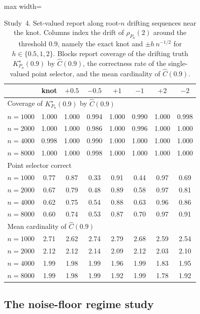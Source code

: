 \documentclass[11pt]{article}
\begin{document}
\begin{table}[t]
\centering
\caption{Study~4. Set-valued report along root-$n$ drifting sequences near the knot. Columns index the drift of $\rho_{P_n}(2)$ around the threshold $0.9$, namely the exact knot and $\pm h\,n^{-1/2}$ for $h\in\{0.5,1,2\}$. Blocks report coverage of the drifting truth $K^\star_{P_n}(0.9)$ by $\widehat C(0.9)$, the correctness rate of the single-valued point selector, and the mean cardinality of $\widehat C(0.9)$.}
\label{tab:sims:study5_addtional}
\begin{adjustbox}{max width=\textwidth}
\begin{tabular}{l ccccccc}
\toprule
& knot & $+0.5$ & $-0.5$ & $+1$ & $-1$ & $+2$ & $-2$\\
\midrule
\multicolumn{8}{l}{Coverage of $K^\star_{P_n}(0.9)$ by $\widehat C(0.9)$}\\
$n=1000$ & 1.000 & 1.000 & 0.994 & 1.000 & 0.990 & 1.000 & 0.998\\
$n=2000$ & 1.000 & 1.000 & 0.986 & 1.000 & 0.996 & 1.000 & 1.000\\
$n=4000$ & 0.998 & 1.000 & 0.990 & 1.000 & 1.000 & 1.000 & 1.000\\
$n=8000$ & 1.000 & 1.000 & 0.998 & 1.000 & 1.000 & 1.000 & 1.000\\
\midrule
\multicolumn{8}{l}{Point selector correct}\\
$n=1000$ & 0.77 & 0.87 & 0.33 & 0.91 & 0.44 & 0.97 & 0.69\\
$n=2000$ & 0.67 & 0.79 & 0.48 & 0.89 & 0.58 & 0.97 & 0.81\\
$n=4000$ & 0.62 & 0.75 & 0.54 & 0.88 & 0.63 & 0.96 & 0.86\\
$n=8000$ & 0.60 & 0.74 & 0.53 & 0.87 & 0.70 & 0.97 & 0.91\\
\midrule
\multicolumn{8}{l}{Mean cardinality of $\widehat C(0.9)$}\\
$n=1000$ & 2.71 & 2.62 & 2.74 & 2.79 & 2.68 & 2.59 & 2.54\\
$n=2000$ & 2.12 & 2.12 & 2.14 & 2.09 & 2.12 & 2.03 & 2.10\\
$n=4000$ & 1.99 & 1.98 & 1.99 & 1.96 & 1.99 & 1.83 & 1.95\\
$n=8000$ & 1.99 & 1.98 & 1.99 & 1.92 & 1.99 & 1.78 & 1.92\\
\bottomrule
\end{tabular}
\end{adjustbox}
\end{table}

\subsection{The noise-floor regime study}\label{sec:sims:study6_supp}
\end{document}
